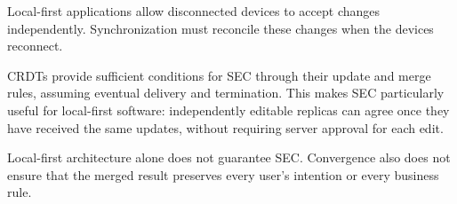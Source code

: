 Local-first applications allow disconnected devices to accept changes independently.
Synchronization must reconcile these changes when the devices reconnect.
\parencite[Chapter~5]{designing-data-intensive-applications}

CRDTs provide sufficient conditions for SEC through their update and merge rules, assuming eventual delivery and termination.
This makes SEC particularly useful for local-first software: independently editable replicas can agree once they have received the same updates, without requiring server approval for each edit.
\parencite[Section~2.3, Theorem~1]{conflict-free-replicated-data-types}

Local-first architecture alone does not guarantee SEC.
Convergence also does not ensure that the merged result preserves every user's intention or every business rule.
\parencite[Section~11.2]{understanding-distributed-systems}
